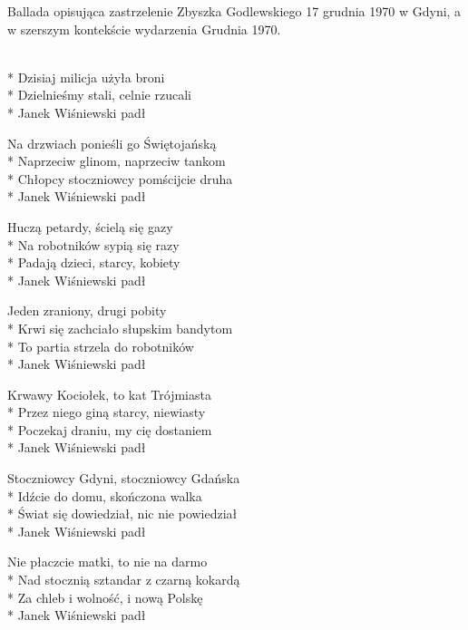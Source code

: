 \begin{info}Ballada opisująca zastrzelenie Zbyszka Godlewskiego 17 grudnia 1970 w Gdyni, a w szerszym kontekście wydarzenia Grudnia 1970.\end{info}

\begin{lyrics}[longestline={Świat się dowiedział, nic nie powiedział}]

\\*
Dzisiaj milicja użyła broni\\*
Dzielnieśmy stali, celnie rzucali\\*
Janek Wiśniewski padł

Na drzwiach ponieśli go Świętojańską\\*
Naprzeciw glinom, naprzeciw tankom\\*
Chłopcy stoczniowcy pomścijcie druha\\*
Janek Wiśniewski padł

Huczą petardy, ścielą się gazy\\*
Na robotników sypią się razy\\*
Padają dzieci, starcy, kobiety\\*
Janek Wiśniewski padł

Jeden zraniony, drugi pobity\\*
Krwi się zachciało słupskim bandytom\\*
To partia strzela do robotników\\*
Janek Wiśniewski padł

Krwawy Kociołek, to kat Trójmiasta\\*
Przez niego giną starcy, niewiasty\\*
Poczekaj draniu, my cię dostaniem\\*
Janek Wiśniewski padł

Stoczniowcy Gdyni, stoczniowcy Gdańska\\*
Idźcie do domu, skończona walka\\*
Świat się dowiedział, nic nie powiedział\\*
Janek Wiśniewski padł

Nie płaczcie matki, to nie na darmo\\*
Nad stocznią sztandar z czarną kokardą\\*
Za chleb i wolność, i nową Polskę\\*
Janek Wiśniewski padł
\end{lyrics}




